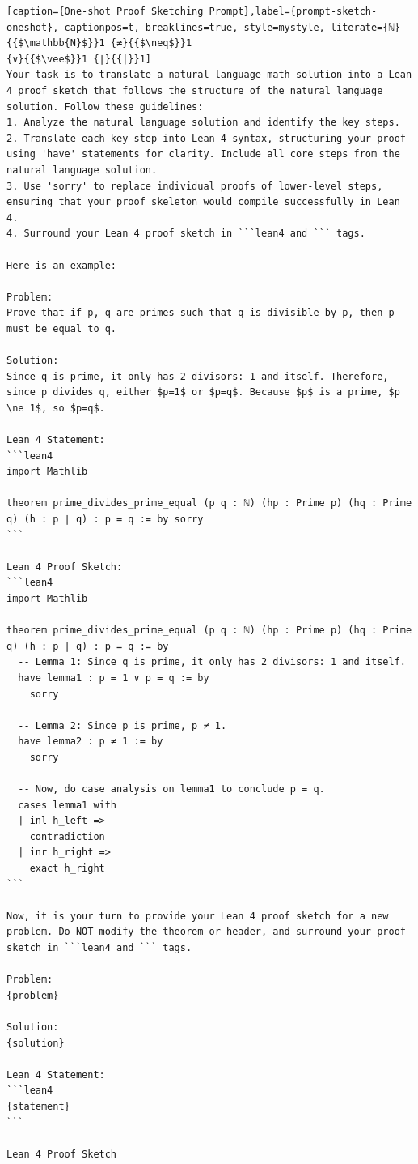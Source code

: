\begin{lstlisting}[caption={One-shot Proof Sketching Prompt},label={prompt-sketch-oneshot}, captionpos=t, breaklines=true, style=mystyle, literate={ℕ}{{$\mathbb{N}$}}1 {≠}{{$\neq$}}1
{∨}{{$\vee$}}1 {∣}{{|}}1]
Your task is to translate a natural language math solution into a Lean 4 proof sketch that follows the structure of the natural language solution. Follow these guidelines:
1. Analyze the natural language solution and identify the key steps.
2. Translate each key step into Lean 4 syntax, structuring your proof using 'have' statements for clarity. Include all core steps from the natural language solution.
3. Use 'sorry' to replace individual proofs of lower-level steps, ensuring that your proof skeleton would compile successfully in Lean 4.
4. Surround your Lean 4 proof sketch in ```lean4 and ``` tags.

Here is an example:

Problem:
Prove that if p, q are primes such that q is divisible by p, then p must be equal to q.

Solution:
Since q is prime, it only has 2 divisors: 1 and itself. Therefore, since p divides q, either $p=1$ or $p=q$. Because $p$ is a prime, $p \ne 1$, so $p=q$.

Lean 4 Statement:
```lean4
import Mathlib

theorem prime_divides_prime_equal (p q : ℕ) (hp : Prime p) (hq : Prime q) (h : p ∣ q) : p = q := by sorry
```

Lean 4 Proof Sketch:
```lean4
import Mathlib

theorem prime_divides_prime_equal (p q : ℕ) (hp : Prime p) (hq : Prime q) (h : p ∣ q) : p = q := by
  -- Lemma 1: Since q is prime, it only has 2 divisors: 1 and itself.
  have lemma1 : p = 1 ∨ p = q := by
    sorry

  -- Lemma 2: Since p is prime, p ≠ 1.
  have lemma2 : p ≠ 1 := by
    sorry

  -- Now, do case analysis on lemma1 to conclude p = q.
  cases lemma1 with
  | inl h_left =>
    contradiction
  | inr h_right =>
    exact h_right
```

Now, it is your turn to provide your Lean 4 proof sketch for a new problem. Do NOT modify the theorem or header, and surround your proof sketch in ```lean4 and ``` tags.

Problem:
{problem}

Solution:
{solution}

Lean 4 Statement:
```lean4
{statement}
```

Lean 4 Proof Sketch
\end{lstlisting}

